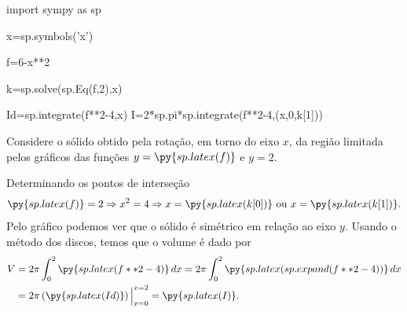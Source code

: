 \documentclass[a4paper,addpoints,12pt]{exam}
\newcommand{\pyl}[1]{\py{sp.latex(#1)}}
\begin{document}
\begin{questions}
\begin{solution}
\end{solution}

\newpage

\begin{pycode}
import sympy as sp

x=sp.symbols('x')

f=6-x**2

k=sp.solve(sp.Eq(f,2),x)

Id=sp.integrate(f**2-4,x)
I=2*sp.pi*sp.integrate(f**2-4,(x,0,k[1]))
	
\end{pycode}

\question[2] Considere o sólido obtido pela rotação, em torno do eixo $x$, da região limitada pelos gráficos das funções $y=\pyl{f}$ e $y=2$. 


\begin{solution}
Determinando os pontos de interseção
\[\pyl{f}=2\Rightarrow x^2=4 \Rightarrow  x=\pyl{k[0]} \text{ ou } x=\pyl{k[1]}.\]
Pelo gráfico podemos ver que o sólido é simétrico em relação ao eixo $y$. Usando o método dos discos, temos que o volume é dado por
\begin{equation*}
\begin{split}
V& =2\pi\int_0^2\pyl{f**2-4}\,dx=2\pi\int_0^2 \pyl{sp.expand(f**2-4)}\,dx\\
& =2\pi\left(\pyl{Id}\right)\Big\vert_{x=0}^{x=2}=\pyl{I}.
\end{split}
\end{equation*}	
\end{solution}


\end{questions}
\end{document}
